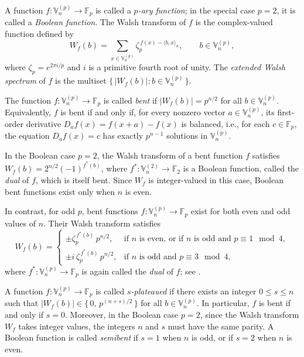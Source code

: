 \documentclass[12pt]{article}
\theoremstyle{plain}
\theoremstyle{definition}
\newcommand{\V}{\mathbb{V}}
\renewcommand{\to}{\rightarrow}
\begin{document}
	A function \(f : \V_n^{(p)} \to \mathbb{F}_p\) is called a \emph{\(p\)-ary
		function}; in the special case \(p=2\), it is called a \emph{Boolean function}.
	The Walsh transform of \(f\) is the complex-valued function defined by
	\[
	W_f(b)
	=
	\sum_{x \in \V_n^{(p)}}
	\zeta_p^{\,f(x) - \langle b, x \rangle_n},
	\qquad b \in \V_n^{(p)},
	\]
	where \(\zeta_p = e^{2\pi i/p}\) and \(i\) is a primitive fourth root of unity.
	The \emph{extended Walsh spectrum} of \(f\) is the multiset
	\(\{\, |W_f(b)| : b \in \V_n^{(p)} \,\}\).
	
	The function \(f : \V_n^{(p)} \to \mathbb{F}_p\) is called \emph{bent} if $|W_f(b)| = p^{n/2}$ for all $b \in \V_n^{(p)}$.
	Equivalently, \(f\) is bent if and only if, for every nonzero vector
	\(a \in \V_n^{(p)}\), its first-order derivative $D_a f(x) = f(x+a) - f(x)$
	is balanced, i.e., for each \(c \in \mathbb{F}_p\), the equation
	\(D_a f(x) = c\) has exactly \(p^{n-1}\) solutions in \(\V_n^{(p)}\).
	
	In the Boolean case \(p=2\), the Walsh transform of a bent function \(f\)
	satisfies $W_f(b) = 2^{n/2} (-1)^{f^{\ast}(b)}$,
	where \(f^{\ast} : \V_n^{(2)} \to \mathbb{F}_2\) is a Boolean function, called the
	\emph{dual} of \(f\), which is itself bent.
	Since \(W_f\) is integer-valued in this case, Boolean bent functions exist only
	when \(n\) is even.
	
	In contrast, for odd $p$, bent functions 
	$f : \V_n^{(p)} \to \mathbb{F}_p$ exist for both even and odd values of $n$.
	Their Walsh transform satisfies
	\[
	W_f(b) =
	\begin{cases}
	\pm \zeta_p^{\,f^{\ast}(b)} \, p^{n/2},
	& \text{if \(n\) is even, or if \(n\) is odd and \(p \equiv 1 \mod{4}\)}, \\[1ex]
	\pm i\, \zeta_p^{\,f^{\ast}(b)} \, p^{n/2},
	& \text{if \(n\) is odd and \(p \equiv 3 \mod{4}\)},
	\end{cases}
	\]
	where 
	\(f^{\ast} : \V_n^{(p)} \to \mathbb{F}_p\) is again called the \emph{dual} of
	\(f\); see \cite{KSW85}.
	
	A function \(f : \V_n^{(p)} \to \mathbb{F}_p\) is called
	\emph{\(s\)-plateaued} if there exists an integer \(0 \le s \le n\) such that $\lvert W_f(b) \rvert \in \{\, 0,\, p^{(n+s)/2} \,\}$ for all $ b \in \V_n^{(p)}$.
	In particular, \(f\) is bent if and only if \(s = 0\).
	Moreover, in the Boolean case \(p = 2\), since the Walsh transform \(W_f\) takes
	integer values, the integers \(n\) and \(s\) must have the same parity.
	A Boolean function is called \emph{semibent} if \(s = 1\) when \(n\) is odd, or
	if \(s = 2\) when \(n\) is even.
	
\end{document}
